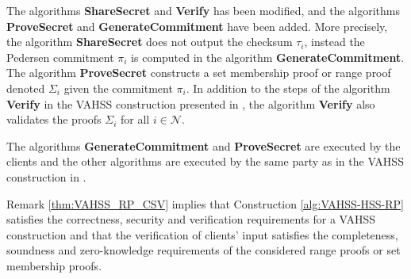 The algorithms \textbf{ShareSecret} and \textbf{Verify} has been modified,  and the algorithms \textbf{ProveSecret} and \textbf{GenerateCommitment} have been added. More precisely, the algorithm \textbf{ShareSecret} does not output the checksum $\tau_i$, instead the Pedersen commitment $\pi_i$ is computed in the algorithm \textbf{GenerateCommitment}. The algorithm \textbf{ProveSecret} constructs a set membership proof or range proof denoted $\Sigma_i$ given the commitment $\pi_i$. 
 In addition to the steps of the algorithm \textbf{Verify} in the VAHSS construction presented in \cite{SumItUp}, the algorithm \textbf{Verify} also validates the proofs $\Sigma_i$ for all $i\in\mathcal{N}$.
 

The algorithms \textbf{GenerateCommitment} and \textbf{ProveSecret} are executed by the clients and the other algorithms are executed by the same party as in the  VAHSS construction in \cite{SumItUp}. 

Remark \ref{thm:VAHSS_RP_CSV}  implies that Construction \ref{alg:VAHSS-HSS-RP} satisfies the correctness, security and verification requirements for a VAHSS construction and that the verification of clients' input satisfies the completeness, soundness and zero-knowledge requirements of the considered range proofs or set membership proofs.



